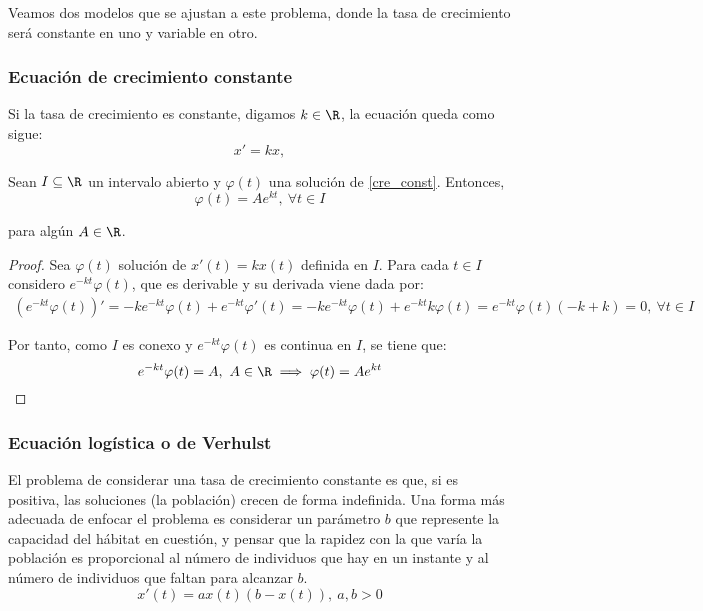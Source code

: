 Veamos dos modelos que se ajustan a este problema, donde la tasa de crecimiento será constante en uno y variable en otro.

\subsubsection{Ecuación de crecimiento constante}
Si la tasa de crecimiento es constante, digamos $k \in \R$, la ecuación queda como sigue:
\begin{equation}
	x' = kx, \label{cre_const} \tag{E}
\end{equation} 

\begin{nth}
  Sean $I \subseteq \R$ un intervalo abierto y $\varphi(t)$ una solución de \eqref{cre_const}. Entonces,
  \[\varphi (t) = Ae^{kt}, \ \forall t \in I\]

  para algún $A\in \R$.

\end{nth}

\begin{proof}
  Sea $\varphi(t)$ solución de $x'(t) = kx(t)$ definida en $I$. Para cada $t\in I$ considero $e^{-kt}\varphi (t)$, que es derivable y su derivada viene dada por:
  \[
  \begin{array}{l}
    (e^{-kt}\varphi (t))' = -ke^{-kt}\varphi (t) + e^{-kt}\varphi' (t) = -ke^{-kt}\varphi (t) + e^{-kt}k\varphi (t) = e^{-kt}\varphi (t) (-k+k) = 0, \ \forall t \in I
  \end{array}
  \]

  Por tanto, como $I$ es conexo y $e^{-kt}\varphi(t)$ es continua en $I$, se tiene que:
  \[
      e^{-kt}\varphi(t) = A, \ A\in \R \implies \varphi(t) = Ae^{kt}
  \]
  
\end{proof}

\subsubsection{Ecuación logística o de Verhulst}

El problema de considerar una tasa de crecimiento constante es que, si es positiva, las soluciones (la población) crecen de forma indefinida. Una forma más adecuada de enfocar el problema es considerar un parámetro $b$ que represente la capacidad del hábitat en cuestión, y pensar que la rapidez con la que varía la población es proporcional al número de individuos que hay en un instante y al número de individuos que faltan para alcanzar $b$.
\[
x'(t) = ax(t)(b-x(t)), \ a,b > 0
\]

